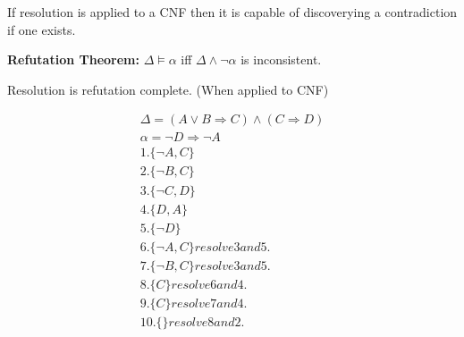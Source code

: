 \documentclass[11pt]{article}
\begin{document}
If resolution is applied to a CNF then it is capable of discoverying a contradiction if one exists.
\vspace{1em}

\textbf{Refutation Theorem:} $\Delta \models \alpha$ iff $\Delta \land \neg \alpha$ is inconsistent.

Resolution is refutation complete. (When applied to CNF)

\begin{align*}
\Delta = (A \lor B \Rightarrow C) \land (C \Rightarrow D)\\
\alpha = \neg D \Rightarrow \neg A\\
1. \{\neg A, C\}\\
2. \{\neg B, C\}\\
3. \{\neg C, D\}\\
4. \{D, A\}\\
5. \{\neg D\}\\
6. \{\neg A, C\} resolve 3 and 5.\\
7. \{\neg B, C\} resolve 3 and 5.\\
8. \{C\} resolve 6 and 4.\\
9. \{C\} resolve 7 and 4.\\
10. \{\} resolve 8 and 2.
\end{align*}
\end{document}

